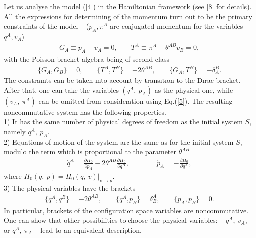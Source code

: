 \documentclass[paper a4]{article}
\begin{document}
Let us analyse the model (\ref{4}) in the Hamiltonian framework (see
[8] for details). All the expressions for determining
of the momentum turn out to be the primary constraints of the model ~
($p_A,  \pi^A$ are conjugated momentum for the variables $q^A,  v_A$)
\begin{eqnarray}\label{5}
G_A\equiv p_A-v_A=0, \qquad
T^A\equiv\pi^A-\theta^{AB}v_B=0,
\end{eqnarray}
with the Poisson bracket algebra being of second class
\begin{eqnarray}\label{6}
\{G_A, G_B\}=0, \qquad \{T^A, T^B\}=
-2\theta^{AB}, \qquad
\{G_A, T^B\}=-\delta_A^B.
\end{eqnarray}
The constraints can be taken into account by transition to the Dirac
bracket. After that, one can take the variables $(q^A, ~ p_A)$ as the
physical one, while $(v_A, ~ \pi^A)$ can be omitted from consideration
using Eq.(\ref{5}). The resulting noncommutative system has the
following properties. \\
1) It has the same number of physical degrees of freedom as the initial
system $S$, namely $q^A, ~ p_A$. \\
2) Equations of motion of the system are the same as for the initial
system $S$, modulo the term which is proportional to the parameter
$\theta^{AB}$
\begin{eqnarray}\label{7}
\dot q^A=\frac{\partial H_0}{\partial p_A}-2\theta^{AB}
\frac{\partial H_0}{\partial q^B}, \qquad
\qquad \dot p_A=-\frac{\partial H_0}{\partial q^A},
\end{eqnarray}
where $H_0(q, ~ p)=H_0(q, ~ v)|_{v\rightarrow p}$. \\
3) The physical variables have the brackets
\begin{eqnarray}\label{8}
\{q^A, q^B\}=-2\theta^{AB}, \qquad
\{q^A, p_B\}=\delta^A_B,
\qquad \{p_A, p_B\}=0.
\end{eqnarray}
In particular, brackets of the configuration space variables are
noncommutative. One can show that other possibilities to choose the
physical variables: ~ $q^A, ~ v_A$, or $q^A, ~ \pi_A$ ~ lead to an
equivalent description.
\end{document}
